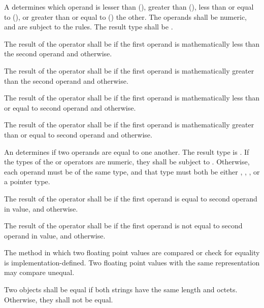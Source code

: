 \specsubsubitem
A  determines which operand is lesser than
(\terminal{<}), greater than (\terminal{>}), less than or equal to
(\terminal{<=}), or greater than or equal to (\terminal{>=}) the other. The
operands shall be numeric, and are subject to the 
rules.  The result type shall be .

\specsubsubitem
The result of the \terminal{<} operator shall be  if the first
operand is mathematically less than the second operand and 
otherwise.

\specsubsubitem
The result of the \terminal{>} operator shall be  if the first
operand is mathematically greater than the second operand and 
otherwise.

\specsubsubitem
The result of the \terminal{<=} operator shall be  if the
first operand is mathematically less than or equal to second operand
and  otherwise.

\specsubsubitem
The result of the \terminal{>=} operator shall be  if the first
operand is mathematically greater than or equal to second operand
and  otherwise.

\specsubsubitem
An  determines if two operands are equal to one
another. The result type is . If the types of the \terminal{==}
or \terminal{!=} operators are numeric, they shall be subject to
. Otherwise, each operand must be of the same type, and
that type must both be either , , ,
or a pointer type.

\specsubsubitem
The result of the \terminal{==} operator shall be  if the first
operand is equal to second operand in value, and  otherwise.

\specsubsubitem
The result of the \terminal{!=} operator shall be  if the first
operand is not equal to second operand in value, and  otherwise.

\specsubsubitem
The method in which two floating point values are compared or check for equality
is implementation-defined. Two floating point values with the same
representation may compare unequal.

\specsubsubitem
Two  objects shall be equal if both strings have the same length
and octets. Otherwise, they shall not be equal.

